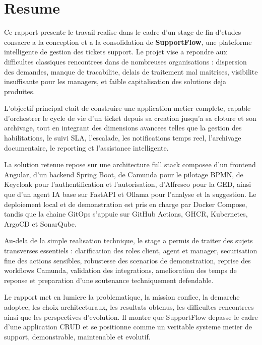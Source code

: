 \chapter*{Resume}

Ce rapport presente le travail realise dans le cadre d'un stage de fin d'etudes consacre a la conception et a la consolidation de \textbf{SupportFlow}, une plateforme intelligente de gestion des tickets support. Le projet vise a repondre aux difficultes classiques rencontrees dans de nombreuses organisations : dispersion des demandes, manque de tracabilite, delais de traitement mal maitrises, visibilite insuffisante pour les managers, et faible capitalisation des solutions deja produites.

L'objectif principal etait de construire une application metier complete, capable d'orchestrer le cycle de vie d'un ticket depuis sa creation jusqu'a sa cloture et son archivage, tout en integrant des dimensions avancees telles que la gestion des habilitations, le suivi SLA, l'escalade, les notifications temps reel, l'archivage documentaire, le reporting et l'assistance intelligente.

La solution retenue repose sur une architecture full stack composee d'un frontend Angular, d'un backend Spring Boot, de Camunda pour le pilotage BPMN, de Keycloak pour l'authentification et l'autorisation, d'Alfresco pour la GED, ainsi que d'un agent IA base sur FastAPI et Ollama pour l'analyse et la suggestion. Le deploiement local et de demonstration est pris en charge par Docker Compose, tandis que la chaine GitOps s'appuie sur GitHub Actions, GHCR, Kubernetes, ArgoCD et SonarQube.

Au-dela de la simple realisation technique, le stage a permis de traiter des sujets transverses essentiels : clarification des roles client, agent et manager, securisation fine des actions sensibles, robustesse des scenarios de demonstration, reprise des workflows Camunda, validation des integrations, amelioration des temps de reponse et preparation d'une soutenance techniquement defendable.

Le rapport met en lumiere la problematique, la mission confiee, la demarche adoptee, les choix architecturaux, les resultats obtenus, les difficultes rencontrees ainsi que les perspectives d'evolution. Il montre que SupportFlow depasse le cadre d'une application CRUD et se positionne comme un veritable systeme metier de support, demonstrable, maintenable et evolutif.
